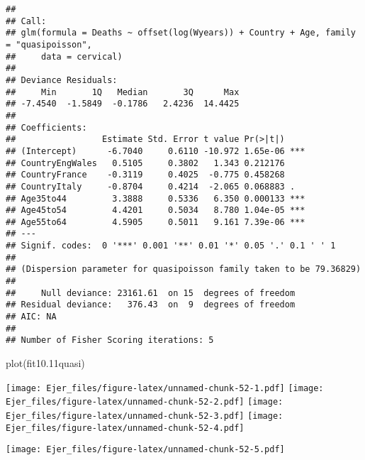 \documentclass[
]{article}
\newenvironment{Shaded}{\begin{snugshade}}{\end{snugshade}}
\newcommand{\DecValTok}[1]{\textcolor[rgb]{0.00,0.00,0.81}{#1}}
\newcommand{\FloatTok}[1]{\textcolor[rgb]{0.00,0.00,0.81}{#1}}
\newcommand{\FunctionTok}[1]{\textcolor[rgb]{0.00,0.00,0.00}{#1}}
\newcommand{\NormalTok}[1]{#1}
\newcommand{\OtherTok}[1]{\textcolor[rgb]{0.56,0.35,0.01}{#1}}
\newcommand{\SpecialCharTok}[1]{\textcolor[rgb]{0.00,0.00,0.00}{#1}}
\begin{document}
\begin{verbatim}
## 
## Call:
## glm(formula = Deaths ~ offset(log(Wyears)) + Country + Age, family = "quasipoisson", 
##     data = cervical)
## 
## Deviance Residuals: 
##     Min       1Q   Median       3Q      Max  
## -7.4540  -1.5849  -0.1786   2.4236  14.4425  
## 
## Coefficients:
##                 Estimate Std. Error t value Pr(>|t|)    
## (Intercept)      -6.7040     0.6110 -10.972 1.65e-06 ***
## CountryEngWales   0.5105     0.3802   1.343 0.212176    
## CountryFrance    -0.3119     0.4025  -0.775 0.458268    
## CountryItaly     -0.8704     0.4214  -2.065 0.068883 .  
## Age35to44         3.3888     0.5336   6.350 0.000133 ***
## Age45to54         4.4201     0.5034   8.780 1.04e-05 ***
## Age55to64         4.5905     0.5011   9.161 7.39e-06 ***
## ---
## Signif. codes:  0 '***' 0.001 '**' 0.01 '*' 0.05 '.' 0.1 ' ' 1
## 
## (Dispersion parameter for quasipoisson family taken to be 79.36829)
## 
##     Null deviance: 23161.61  on 15  degrees of freedom
## Residual deviance:   376.43  on  9  degrees of freedom
## AIC: NA
## 
## Number of Fisher Scoring iterations: 5
\end{verbatim}

\begin{Shaded}
\begin{Highlighting}[]
\FunctionTok{plot}\NormalTok{(fit10}\FloatTok{.11}\NormalTok{quasi)}
\end{Highlighting}
\end{Shaded}

\texttt{[image: Ejer\_files/figure-latex/unnamed-chunk-52-1.pdf]}
\texttt{[image: Ejer\_files/figure-latex/unnamed-chunk-52-2.pdf]}
\texttt{[image: Ejer\_files/figure-latex/unnamed-chunk-52-3.pdf]}
\texttt{[image: Ejer\_files/figure-latex/unnamed-chunk-52-4.pdf]}

\begin{Shaded}
\end{Shaded}

\texttt{[image: Ejer\_files/figure-latex/unnamed-chunk-52-5.pdf]}
\end{document}

